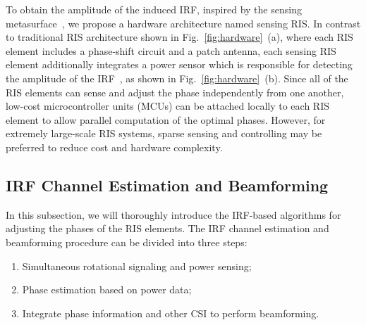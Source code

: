 \documentclass[journal,twocolumn]{IEEEtran}
\theoremstyle{nonumberplain}
\begin{document}
To obtain the amplitude of the induced \ac{IRF}, inspired by the sensing metasurface~\cite{ma2019smart}, we propose a hardware architecture named sensing RIS.
In contrast to traditional RIS architecture shown in Fig.~\ref{fig:hardware}~(a), where each RIS element includes a phase-shift circuit and a patch antenna, each sensing RIS element additionally integrates a power sensor which is responsible for detecting the amplitude of the IRF~\cite{ma2020smartsensing}, as shown in Fig.~\ref{fig:hardware}~(b).
Since all of the RIS elements can sense and adjust the phase independently from one another, low-cost microcontroller units (MCUs) can be attached locally to each RIS element to allow parallel computation of the optimal phases. 
However, for extremely large-scale RIS systems, sparse sensing and controlling may be preferred to reduce cost and hardware complexity. 

\subsection{IRF Channel Estimation and Beamforming} \label{IRF Channel Estimation and Beamforming}
    In this subsection, we will thoroughly introduce the IRF-based algorithms for adjusting the phases of the RIS elements. The \ac{IRF} channel estimation and beamforming procedure can be divided into three steps:
    \begin{enumerate}
        \item Simultaneous rotational signaling and power sensing; 
        \item Phase estimation based on power data;
        \item Integrate phase information and other CSI to perform beamforming. 
    \end{enumerate} 
\end{document}
